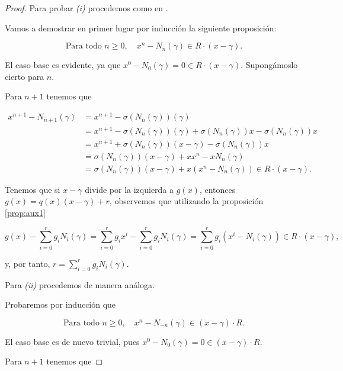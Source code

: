 \begin{proof}
Para probar \textit{(i)} procedemos como en \cite[Lema 2.4]{Norm}.

Vamos a demostrar en primer lugar por inducción la siguiente proposición:

\begin{equation} \label{prop:aux1}
    \text{Para todo } n \geq 0, \quad x^n - N_n(\gamma) \in R\cdot(x-\gamma).
\end{equation}

El caso base es evidente, ya que $x^0 - N_0(\gamma) = 0 \in R\cdot(x - \gamma)$. Supongámoslo cierto para $n$.

Para $n + 1$ tenemos que

\begin{align*}
    x^{n+1} - N_{n+1}(\gamma) &= x^{n+1} - \sigma(N_n(\gamma))(\gamma) \\
                              &= x^{n+1} - \sigma(N_n(\gamma))(\gamma) + \sigma(N_n(\gamma))x - \sigma(N_n(\gamma))x \\
                              &= x^{n+1} + \sigma(N_n(\gamma))(x-\gamma) - \sigma(N_n(\gamma))x \\
                              &= \sigma(N_n(\gamma))(x-\gamma) + xx^n -xN_n(\gamma) \\
                              &=  \sigma(N_n(\gamma))(x-\gamma) + x(x^n - N_n(\gamma)) \in R\cdot(x-\gamma).
\end{align*}


Tenemos que si $x - \gamma$ divide por la izquierda a $g(x)$, entonces $g(x) = q(x)(x-\gamma) + r$, observemos que utilizando la proposición \eqref{prop:aux1}

$$g(x) - \sum_{i=0}^{r} g_iN_i(\gamma) = \sum_{i=0}^{r}g_ix^i - \sum_{i=0}^{r} g_iN_i(\gamma) =  \sum_{i=0}^{r} g_i(x^i - N_i(\gamma))  \in R\cdot(x-\gamma),$$

y, por tanto, $r = \sum_{i=0}^{r} g_iN_i(\gamma)$.

Para \textit{(ii)} procedemos de manera análoga.

Probaremos por inducción que 

\begin{equation} \label{prop:aux2}
    \text{Para todo } n \geq 0, \quad x^n - N_{-n}(\gamma) \in (x-\gamma)\cdot R.
\end{equation}

El caso base es de nuevo trivial, pues $x^0 - N_0(\gamma) = 0 \in (x-\gamma)\cdot R.$

Para $n + 1$ tenemos que


\end{proof}
